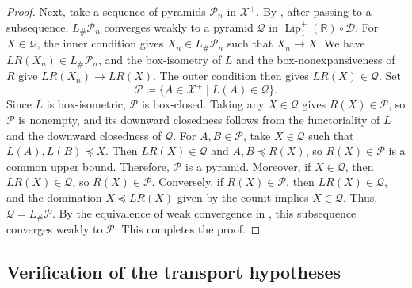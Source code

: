 \documentclass{amsart}
\theoremstyle{plain}
\theoremstyle{definition}
\theoremstyle{remark}
\newcommand{\R}{\mathbb{R}}
\newcommand{\D}{\mathcal{D}}
\newcommand{\Xp}{\mathcal{X}^{+}}
\newcommand{\Lup}{\operatorname{Lip}^{+}_{1}(\R)}
\begin{document}
\begin{proof}
Next, take a sequence of pyramids $\mathcal P_n$ in $\Xp$. By , after passing to a subsequence, $L_{\#}\mathcal P_n$ converges weakly to a pyramid $\mathcal Q$ in $\Lup\circ\D$. For $X\in\mathcal Q$, the inner condition gives $X_n\in L_{\#}\mathcal P_n$ such that $X_n\to X$. We have $LR(X_n)\in L_{\#}\mathcal P_n$, and the box-isometry of $L$ and the box-nonexpansiveness of $R$ give $LR(X_n)\to LR(X)$. The outer condition then gives $LR(X)\in\mathcal Q$. Set
\[\mathcal P\coloneqq\{A\in\Xp\mid L(A)\in\mathcal Q\}.\]
Since $L$ is box-isometric, $\mathcal P$ is box-closed. Taking any $X\in\mathcal Q$ gives $R(X)\in\mathcal P$, so $\mathcal P$ is nonempty, and its downward closedness follows from the functoriality of $L$ and the downward closedness of $\mathcal Q$. For $A,B\in\mathcal P$, take $X\in\mathcal Q$ such that $L(A),L(B)\preceq X$. Then $LR(X)\in\mathcal Q$ and $A,B\preceq R(X)$, so $R(X)\in\mathcal P$ is a common upper bound. Therefore, $\mathcal P$ is a pyramid. Moreover, if $X\in\mathcal Q$, then $LR(X)\in\mathcal Q$, so $R(X)\in\mathcal P$. Conversely, if $R(X)\in\mathcal P$, then $LR(X)\in\mathcal Q$, and the domination $X\preceq LR(X)$ given by the counit implies $X\in\mathcal Q$. Thus, $\mathcal Q=L_{\#}\mathcal P$. By the equivalence of weak convergence in , this subsequence converges weakly to $\mathcal P$.
This completes the proof.
\end{proof}

\subsection{Verification of the transport hypotheses}
\label{sec:transport-hypotheses}
\end{document}
